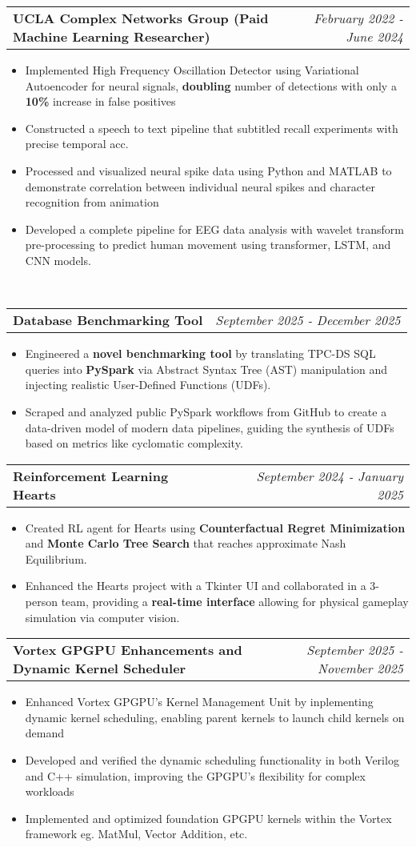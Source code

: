 \documentclass[letterpaper,11pt]{article}
\makeatletter
\newcommand{\resitem}[1]{\item #1 \vspace{-8pt}}
\newcommand{\resheading}[1]{\vspace{8pt}{\Large \textbf{#1}}\\\vspace{-8pt}\hrulefill}
\newcommand{\ressubheadingsmol}[2]{\vspace{1pt}
\begin{tabular*}{7.0in}{l@{\cftdotfill{\cftsecdotsep}\extracolsep{\fill}}r}
		\textbf{#1} & \textit{#2} \\
\end{tabular*}\vspace{-6pt}}
\makeatother
\begin{document}
\ressubheadingsmol{UCLA Complex Networks Group (Paid Machine Learning Researcher)}{February 2022 - June 2024}
\begin{itemize}
    \resitem{Implemented High Frequency Oscillation Detector using Variational Autoencoder for neural signals, \textbf{doubling} number of detections with only a \textbf{10\%} increase in false positives}
    \resitem{Constructed a speech to text pipeline that subtitled recall experiments with precise temporal acc.}
    \resitem{Processed and visualized neural spike data using Python and MATLAB to demonstrate correlation between individual neural spikes and character recognition from animation}
    \resitem{Developed a complete pipeline for EEG data analysis with wavelet transform pre-processing to predict human movement using transformer, LSTM, and CNN models.}

\end{itemize}


\resheading{Projects}
\ressubheadingsmol{Database Benchmarking Tool}{September 2025 - December 2025}
\begin{itemize}
    \resitem{Engineered a\textbf{ novel benchmarking tool} by translating TPC-DS SQL queries into \textbf{PySpark} via Abstract Syntax Tree (AST) manipulation and injecting realistic User-Defined Functions (UDFs).}
    \resitem{Scraped and analyzed public PySpark workflows from GitHub to create a data-driven model of modern data pipelines, guiding the synthesis of UDFs based on metrics like cyclomatic complexity.}
\end{itemize}
\ressubheadingsmol{Reinforcement Learning Hearts}{September 2024 - January 2025}
\begin{itemize}
    \resitem{Created RL agent for Hearts using \textbf{Counterfactual Regret Minimization} and \textbf{Monte Carlo Tree Search} that reaches approximate Nash Equilibrium.}
    \resitem{Enhanced the Hearts project with a Tkinter UI and collaborated in a 3-person team, providing a \textbf{real-time interface} allowing for physical gameplay simulation via computer vision.}
\end{itemize}
\ressubheadingsmol{Vortex GPGPU Enhancements and Dynamic Kernel Scheduler}{September 2025 - November 2025}
\begin{itemize}
    \resitem{Enhanced Vortex GPGPU's Kernel Management Unit by inplementing dynamic kernel scheduling, enabling parent kernels to launch child kernels on demand}
    \resitem{Developed and verified the dynamic scheduling functionality in both Verilog and C++ simulation, improving the GPGPU's flexibility for complex workloads}
    \resitem{Implemented and optimized foundation GPGPU kernels within the Vortex framework eg. MatMul, Vector Addition, etc. }
\end{itemize}
\end{document}
